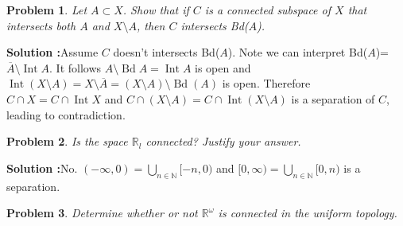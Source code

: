 \documentclass{article}
\newtheorem{problem}{Problem}
\numberwithin{problem}{section}
\DeclareMathOperator{\Int}{Int}
\DeclareMathOperator{\Bd}{Bd}
\begin{document}
\begin{tcolorbox}
\begin{problem}
  Let $A \subset X$. Show that if $C$ is a connected subspace of $X$ that intersects both $A$
and $X\setminus A$, then $C$ intersects Bd($A$).
\end{problem}
\end{tcolorbox}
\textbf{Solution :}Assume $C$ doesn't intersects Bd($A$). Note we can interpret Bd($A$)=$\overline{A}\setminus\Int A$. It follows $A\setminus\Bd A=\Int A$ is open and $\Int (X\setminus A)=X\setminus\overline{A}=(X\setminus A)\setminus \Bd(A)$ is open. Therefore $C\cap X=C\cap \Int X$ and $C\cap(X\setminus A)=C\cap \Int(X\setminus A)$ is a separation of $C$, leading to contradiction.


\begin{tcolorbox}
\begin{problem}
  Is the space $\mathbb R_l$ connected? Justify your answer.
\end{problem}
\end{tcolorbox}
\textbf{Solution :}No. $(-\infty,0)=\bigcup_{n\in\mathbb N}[-n,0)$ and $[0,\infty)=\bigcup_{n\in\mathbb N}[0,n)$ is a separation.  


\begin{tcolorbox}
\begin{problem}
  Determine whether or not 
  $\mathbb R^\omega$ is connected in the uniform topology.
\end{problem}
\end{tcolorbox}
\end{document}
